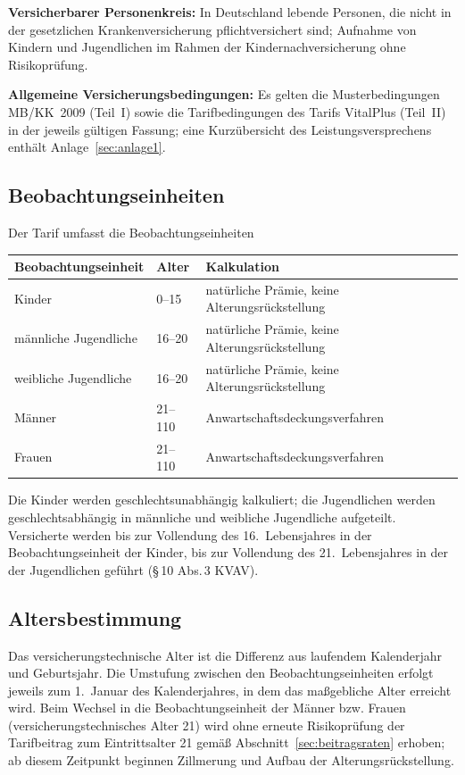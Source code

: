 \textbf{Versicherbarer Personenkreis:} In Deutschland lebende Personen,
die nicht in der gesetzlichen Krankenversicherung pflichtversichert
sind; Aufnahme von Kindern und Jugendlichen im Rahmen der
Kindernachversicherung ohne Risikoprüfung.

\textbf{Allgemeine Versicherungsbedingungen:} Es gelten die
Musterbedingungen MB/KK~2009 (Teil~I) sowie die Tarifbedingungen des
Tarifs VitalPlus (Teil~II) in der jeweils gültigen Fassung; eine
Kurzübersicht des Leistungsversprechens enthält Anlage~\ref{sec:anlage1}.

\subsection{Beobachtungseinheiten}\label{sec:beobachtungseinheiten}

Der Tarif umfasst die Beobachtungseinheiten
\begin{center}\small
\begin{tabular}{@{}lll@{}}
\toprule
Beobachtungseinheit & Alter & Kalkulation \\
\midrule
Kinder & 0--15 & natürliche Prämie, keine Alterungsrückstellung \\
männliche Jugendliche & 16--20 & natürliche Prämie, keine Alterungsrückstellung \\
weibliche Jugendliche & 16--20 & natürliche Prämie, keine Alterungsrückstellung \\
Männer & 21--110 & Anwartschaftsdeckungsverfahren \\
Frauen & 21--110 & Anwartschaftsdeckungsverfahren \\
\bottomrule
\end{tabular}
\end{center}
Die Kinder werden geschlechtsunabhängig kalkuliert; die Jugendlichen
werden geschlechtsabhängig in männliche und weibliche Jugendliche
aufgeteilt. Versicherte werden bis zur Vollendung des 16.~Lebensjahres in
der Beobachtungseinheit der Kinder, bis zur Vollendung des
21.~Lebensjahres in der der Jugendlichen geführt (\S\,10 Abs.\,3 KVAV).

\subsection{Altersbestimmung}\label{sec:altersbestimmung}

Das versicherungstechnische Alter ist die Differenz aus laufendem
Kalenderjahr und Geburtsjahr. Die Umstufung zwischen den
Beobachtungseinheiten erfolgt jeweils zum 1.~Januar des Kalenderjahres,
in dem das maßgebliche Alter erreicht wird. Beim Wechsel in die
Beobachtungseinheit der Männer bzw. Frauen (versicherungstechnisches
Alter 21) wird ohne erneute Risikoprüfung der Tarifbeitrag zum
Eintrittsalter 21 gemäß Abschnitt~\ref{sec:beitragsraten} erhoben;
ab diesem Zeitpunkt beginnen Zillmerung und Aufbau der
Alterungsrückstellung.

